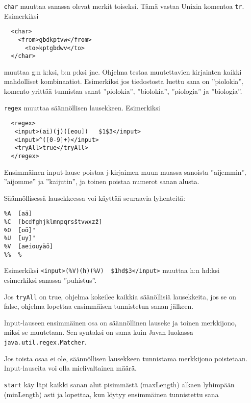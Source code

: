 \documentclass[12pt]{article}
\begin{document}
\bigskip
\verb|char| muuttaa sanassa olevat merkit toiseksi. Tämä vastaa Unixin
komentoa \verb|tr|. Esimerkiksi

\begin{verbatim}
  <char>
    <from>gbdkptvw</from>
      <to>kptgbdwv</to>
  </char>
\end{verbatim}

muuttaa g:n k:ksi, b:n p:ksi jne. Ohjelma testaa muutettavien
kirjainten kaikki mahdolliset kombinaatiot. Esimerkiksi jos
tiedostosta luettu sana on ''piolokia'', komento yrittää tunnistaa
sanat ''piolokia'', ''biolokia'', ''piologia'' ja ''biologia''.




\verb|regex| muuttaa säännöllisen lausekkeen. Esimerkiksi

\begin{verbatim}
  <regex>
   <input>(ai)(j)([eou])   $1$3</input>
   <input>^([0-9]+)</input>
   <tryAll>true</tryAll>
  </regex>
\end{verbatim}

Ensimmäinen input-lause poistaa j-kirjaimen muun muassa sanoista
''aijemmin'', ''aijomme'' ja ''kaijutin'', ja toinen poistaa numerot
sanan alusta.


Säännöllisessä lausekkeessa voi käyttää seuraavia lyhenteitä:

\begin{verbatim}
%A  [aä]
%C  [bcdfghjklmnpqrsštvwxzž]
%O  [oö]"
%U  [uy]"
%V  [aeiouyäö]
%%  %
\end{verbatim}

Esimerkiksi \verb=<input>(%V)(h)(%V)  $1hd$3</input>=
muuttaa h:n hd:ksi esimerkiksi sanassa ''puhistus''.


Jos \verb=tryAll= on true, ohjelma kokeilee kaikkia säänöllisiä
lausekkeita, jos se on false, ohjelma lopettaa ensimmäisen tunnistetun
sanan jälkeen.

Input-lauseen ensimmäinen osa on säännöllinen lauseke ja toinen
merkkijono, miksi se muutetaan. Sen syntaksi on sama kuin Javan
luokassa \verb=java.util.regex.Matcher=.

Jos toista osaa ei ole, säännöllisen lausekkeen tunnistama merkkijono
poistetaan. Input-lauseita voi olla mielivaltainen määrä.




\bigskip
\verb=start= käy läpi kaikki sanan alut pisimmästä (maxLength) alkaen
lyhimpään (minLength) asti ja lopettaa, kun löytyy ensimmäinen
tunnistettu sana
\end{document}
